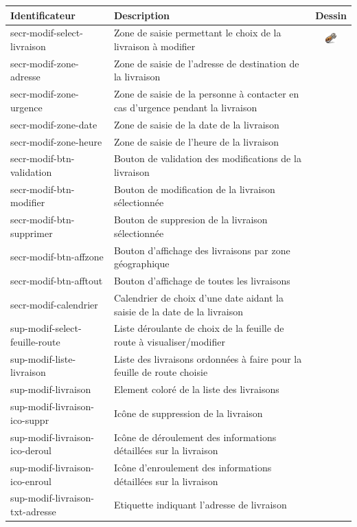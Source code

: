\documentclass{report}
\begin{document}
\begin{longtable}{|p{5cm}|p{5cm}|c|}
\hline
Identificateur&Description&Dessin\\\hline
secr-modif-select-livraison&Zone de saisie permettant le choix de la livraison à modifier&\includegraphics{images/tools.png}\\\hline
secr-modif-zone-adresse&Zone de saisie de l'adresse de destination de la livraison&\\\hline
secr-modif-zone-urgence&Zone de saisie de la personne à contacter en cas d'urgence pendant la livraison&\\\hline
secr-modif-zone-date&Zone de saisie de la date de la livraison&\\\hline
secr-modif-zone-heure&Zone de saisie de l'heure de la livraison&\\\hline
secr-modif-btn-validation&Bouton de validation des modifications de la livraison&\\\hline
secr-modif-btn-modifier&Bouton de modification de la livraison sélectionnée&\\\hline	
secr-modif-btn-supprimer&Bouton de suppresion de la livraison sélectionnée&\\\hline	
secr-modif-btn-affzone&Bouton d'affichage des livraisons par zone géographique&\\\hline	
secr-modif-btn-afftout&Bouton d'affichage de toutes les livraisons&\\\hline	
secr-modif-calendrier&Calendrier de choix d'une date aidant la saisie de la date de la livraison&\\\hline
sup-modif-select-feuille-route&Liste déroulante de choix de la feuille de route à visualiser/modifier&\\\hline
sup-modif-liste-livraison&Liste des livraisons ordonnées à faire pour la feuille de route choisie&\\\hline
sup-modif-livraison&Element coloré de la liste des livraisons&\\\hline
sup-modif-livraison-ico-suppr&Icône de suppression de la livraison&\\\hline
sup-modif-livraison-ico-deroul&Icône de déroulement des informations détaillées sur la livraison&\\\hline
sup-modif-livraison-ico-enroul&Icône d'enroulement des informations détaillées sur la livraison&\\\hline
sup-modif-livraison-txt-adresse&Etiquette indiquant l'adresse de livraison&\\\hline

\end{longtable}
\end{document}
